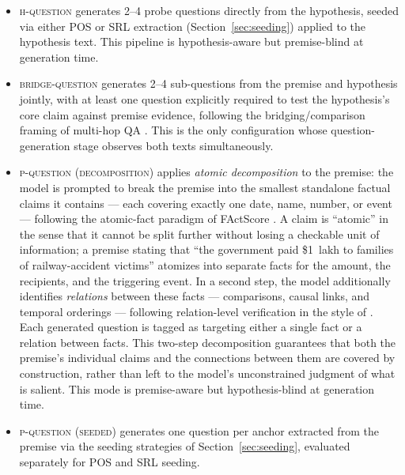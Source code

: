 \begin{itemize}
    \item \textsc{h-question} generates 2--4 probe questions directly from
    the hypothesis, seeded via either POS or SRL extraction
    (Section~\ref{sec:seeding}) applied to the hypothesis text. This pipeline
    is hypothesis-aware but premise-blind at generation time.

    \item \textsc{bridge-question} generates 2--4 sub-questions from the
    premise and hypothesis jointly, with at least one question explicitly
    required to test the hypothesis's core claim against premise evidence,
    following the bridging/comparison framing of multi-hop QA
    \citep{yang-etal-2018-hotpotqa,min-etal-2019-multi}. This is the only configuration
    whose question-generation stage observes both texts simultaneously.

    \item \textsc{p-question (decomposition)} applies \emph{atomic
    decomposition} to the premise: the model is prompted to break the
    premise into the smallest standalone factual claims it contains ---
    each covering exactly one date, name, number, or event --- following
    the atomic-fact paradigm of FActScore \citep{min-etal-2023-factscore}. A claim
    is ``atomic'' in the sense that it cannot be split further without
    losing a checkable unit of information; a premise stating that ``the
    government paid \$1~lakh to families of railway-accident victims''
    atomizes into separate facts for the amount, the recipients, and the
    triggering event. In a second step, the model additionally identifies
    \emph{relations} between these facts --- comparisons, causal links, and
    temporal orderings --- following relation-level verification in the
    style of \citet{goyal2020evaluating,goyal2021annotating}. Each generated
    question is tagged as targeting either a single fact or a relation
    between facts. This two-step decomposition guarantees that both the
    premise's individual claims and the connections between them are
    covered by construction, rather than left to the model's unconstrained
    judgment of what is salient. This mode is premise-aware but
    hypothesis-blind at generation time.

    \item \textsc{p-question (seeded)} generates one question per anchor
    extracted from the premise via the seeding strategies of
    Section~\ref{sec:seeding}, evaluated separately for POS and SRL
    seeding.
\end{itemize}

